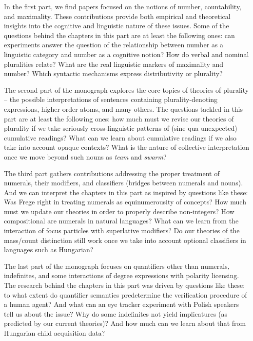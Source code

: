 \documentclass[output=paper]{langscibook}
\begin{document}
In the first part, we find papers focused on the notions of number, countability, and maximality. These contributions provide both empirical and theoretical insights into the cognitive and linguistic nature of these issues. Some of the questions behind the chapters in this part are at least the following ones: can experiments answer the question of the relationship between number as a linguistic category and number as a cognitive notion? How do verbal and nominal pluralities relate? What are the real linguistic markers of maximality and number? Which syntactic mechanisms express distributivity or plurality? 

The second part of the monograph explores the core topics of theories of plurality -- the possible interpretations of sentences containing plurality-denoting expressions, higher-order atoms, and many others. The questions tackled in this part are at least the following ones: how much must we revise our theories of plurality if we take seriously cross-linguistic patterns of (sine qua unexpected) cumulative readings? What can we learn about cumulative readings if we also take into account opaque contexts? What is the nature of collective interpretation once we move beyond such nouns as \textit{team} and \textit{swarm}?

The third part gathers contributions addressing the proper treatment of numerals, their modifiers, and classifiers (bridges between numerals and nouns). And we can interpret the chapters in this part as inspired by questions like these: Was Frege right in treating numerals as equinumerousity of concepts? How much must we update our theories in order to properly describe non-integers? How compositional are numerals in natural languages? What can we learn from the interaction of focus particles with superlative modifiers? Do our theories of the mass/count distinction still work once we take into account optional classifiers in languages such as Hungarian?

The last part of the monograph focuses on quantifiers other than numerals, indefinites, and some interactions of degree expressions with polarity licensing. The research behind the chapters in this part was driven by questions like these: to what extent do quantifier semantics predetermine the verification procedure of a human agent? And what can an eye tracker experiment with Polish speakers tell us about the issue? Why do some indefinites not yield implicatures (as predicted by our current theories)? And how much can we learn about that from Hungarian child acquisition data? 
\end{document}
